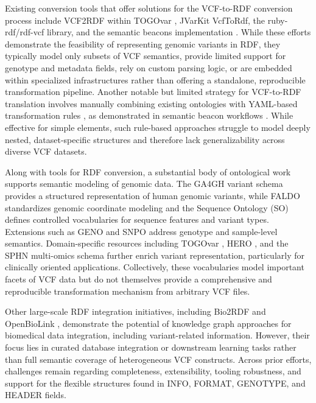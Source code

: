 \documentclass[unnumsec,webpdf,contemporary,large]{oup-authoring-template}
\begin{document}
Existing conversion tools that offer solutions for the VCF-to-RDF conversion process include VCF2RDF within TOGOvar \cite{togovar_2022}, JVarKit VcfToRdf, the ruby-rdf/rdf-vcf library, and the semantic beacons implementation \cite{semantic_beac_2025}. 
While these efforts demonstrate the feasibility of representing genomic variants in RDF, they typically model only subsets of VCF semantics, provide limited support for genotype and metadata fields, rely on custom parsing logic, or are embedded within specialized infrastructures rather than offering a standalone, reproducible transformation pipeline.
Another notable but limited strategy for VCF-to-RDF translation involves manually combining existing ontologies with YAML-based transformation rules \cite{yaml-spec_2025}, as demonstrated in semantic beacon workflows \cite{semantic_beac_2025}. 
While effective for simple elements, such rule-based approaches struggle to model deeply nested, dataset-specific structures and therefore lack generalizability across diverse VCF datasets.

Along with tools for RDF conversion, a substantial body of ontological work supports semantic modeling of genomic data. 
The GA4GH variant schema \cite{ga4gh_varschema_2021} provides a structured representation of human genomic variants, while FALDO \cite{faldo_2016} standardizes genomic coordinate modeling and the Sequence Ontology (SO) \cite{seq_ont_2005} defines controlled vocabularies for sequence features and variant types. 
Extensions such as GENO and SNPO \cite{seq_ont_2005} address genotype and sample-level semantics. 
Domain-specific resources including TOGOvar \cite{togovar_2022}, HERO \cite{hero-genomics_2025}, and the SPHN multi-omics schema \cite{sphn_semantic_2023} further enrich variant representation, particularly for clinically oriented applications. 
Collectively, these vocabularies model important facets of VCF data but do not themselves provide a comprehensive and reproducible transformation mechanism from arbitrary VCF files.

Other large-scale RDF integration initiatives, including Bio2RDF \cite{bio2rdf_2008} and OpenBioLink \cite{openbiolink_2019}, demonstrate the potential of knowledge graph approaches for biomedical data integration, including variant-related information. 
However, their focus lies in curated database integration or downstream learning tasks rather than full semantic coverage of heterogeneous VCF constructs. 
Across prior efforts, challenges remain regarding completeness, extensibility, tooling robustness, and support for the flexible structures found in INFO, FORMAT, GENOTYPE, and HEADER fields.
\end{document}
